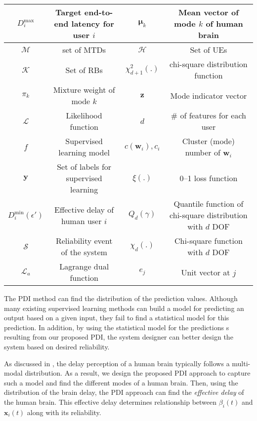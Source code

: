 \documentclass[journal,draftclsnofoot,onecolumn,12pt]{IEEEtran}%
\newcommand{\mub}{\boldsymbol{\mu}}
\newcommand{\xb}{\boldsymbol{x}}
\newcommand{\yb}{\boldsymbol{y}}
\newcommand{\wb}{\boldsymbol{w}}
\newcommand{\zb}{\boldsymbol{z}}
\begin{document}
\begin{table}[!t]
\begin{center}
{{{{\begin{tabular}{|c|c|c|c|}
 				
 				$D_i^{\max}$	&      Target end-to-end latency for user $i$  &$\mub_k$ & Mean vector    of mode $k$ of human brain\\ \hline
 				
 				$\mathcal{M}$	&      set of MTDs        &$\mathcal{H}$ &Set of UEs\\ \hline
 				$\mathcal{K}$	&      Set of RBs        &$\chi_{d+1}^2(.)$ &chi-square distribution function\\ \hline
 				
 					$\mathcal{\pi}_k$	&  Mixture weight of mode $k$        &$\zb$ &Mode indicator vector\\ \hline
 				$\mathcal{L}$	&      Likelihood function &$d$ &\# of features for each user\\ \hline
 				$f$	& Supervised learning model &$c(\wb_i),c_i$ & Cluster (mode) number of $\wb_i$ \\ \hline
 				$\yb$	& Set of labels for supervised learning &$\xi(.)$ & 0--1 loss function\\ \hline
 				
 				$D_i^{\min}(\epsilon')$	& Effective delay of human user $i$ &$Q_d(\gamma)$ & Quantile function of chi-square distribution with $d$ DOF\\ \hline
 				$\mathcal{S}$ & Reliability event of the system
 				&$\chi_d(.)$ &Chi-square function with $d$ DOF\\\hline
 				$\mathcal{L}_a$ & Lagrange dual function & $e_j$ & Unit vector at $j$\\\hline
 				
 		\end{tabular}}}
 		}
 	}
 	\end{center}%
 \end{table}

	
	{The PDI method can find the distribution of the prediction values. Although many existing supervised learning methods can build a model for predicting an output based on a given input, they fail to find a statistical model for this prediction. In addition, by using the statistical model for the predictions s resulting from our proposed PDI, the system designer can better  design the system based on desired reliability. }
	
	

	As discussed in \cite{petkoski2015effects}, the delay perception of a human brain typically follows a multi-modal distribution. As a result, we design the proposed PDI approach to capture such a model and find the different modes of a human brain. Then, using the distribution of the brain delay, the PDI approach can find the \emph{effective delay}  of the human brain. This effective delay determines relationship between $\beta_i(t)$ and $\xb_i(t)$ along with its reliability.
    
\end{document}
